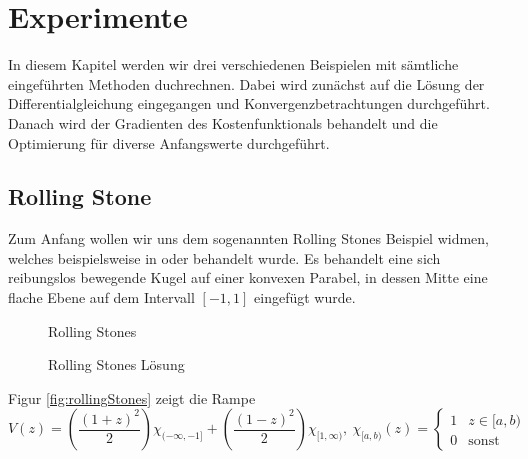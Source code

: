\chapter{Experimente}
In diesem Kapitel werden wir drei verschiedenen Beispielen mit sämtliche eingeführten Methoden duchrechnen. Dabei wird zunächst auf die Lösung der Differentialgleichung eingegangen und Konvergenzbetrachtungen durchgeführt. Danach wird der Gradienten des Kostenfunktionals behandelt und die Optimierung für diverse Anfangswerte durchgeführt. %
\section{Rolling Stone}
Zum Anfang wollen wir uns dem sogenannten Rolling Stones Beispiel widmen, welches beispielsweise in \cite{boeck2014experiments} oder \cite{hasenfelder13} behandelt wurde. 
Es behandelt eine sich reibungslos bewegende Kugel auf einer konvexen Parabel, in dessen Mitte eine flache Ebene auf dem Intervall $[-1,1]$ eingefügt wurde. 
\begin{figure}[ht]
\centering
\begin{minipage}[b]{0.49\linewidth}

\caption{Rolling Stones}
\label{fig:rollingStones}
\end{minipage}
\begin{minipage}[b]{0.49\linewidth}

\caption{Rolling Stones Lösung}
\label{fig:rollingStonesSolution}
\end{minipage}
\end{figure}
Figur \ref{fig:rollingStones} zeigt die Rampe
\[
 V(z) = \left(\frac{(1+z)^2}{2}\right)\chi_{(-\infty,-1]} + \left(\frac{(1-z)^2}{2}\right)\chi_{[1,\infty)} ,
 ~ \chi_{[a,b)}(z) = 
 \begin{cases}
  1 & z \in [a,b)\\
  0 & \text{sonst}
 \end{cases}
\]

